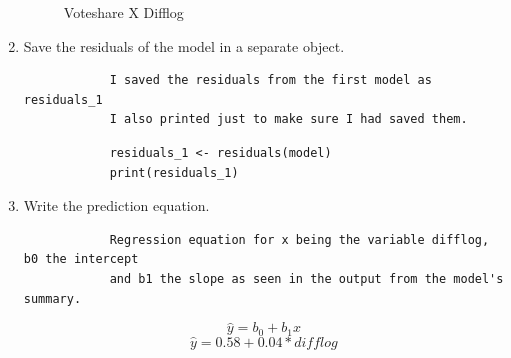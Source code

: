 \documentclass[12pt,letterpaper]{article}
\begin{document}
\begin{enumerate}
\begin{figure}
			\caption{Voteshare X Difflog}
		\end{figure}	
		\item Save the residuals of the model in a separate object.
		\begin{verbatim}
			I saved the residuals from the first model as residuals_1
			I also printed just to make sure I had saved them.
		\end{verbatim}
		 \begin{lstlisting}
			residuals_1 <- residuals(model)
			print(residuals_1)
		\end{lstlisting}
		\item Write the prediction equation.
		\begin{verbatim}
			Regression equation for x being the variable difflog, b0 the intercept 
			and b1 the slope as seen in the output from the model's summary.
		\end{verbatim}
		\begin{equation}
			\hat{y} = b_0 + b_1x
		\end{equation}
		\begin{equation}
			\hat{y} = 0.58 + 0.04*difflog
		\end{equation}
	\end{enumerate}
	
\newpage
\end{document}

